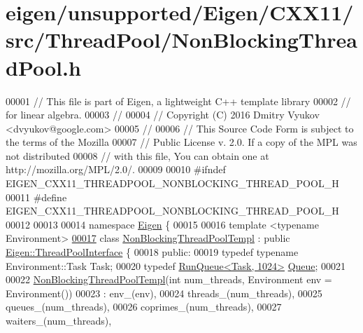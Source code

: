 \hypertarget{eigen_2unsupported_2_eigen_2_c_x_x11_2src_2_thread_pool_2_non_blocking_thread_pool_8h_source}{}\section{eigen/unsupported/\+Eigen/\+C\+X\+X11/src/\+Thread\+Pool/\+Non\+Blocking\+Thread\+Pool.h}
\label{eigen_2unsupported_2_eigen_2_c_x_x11_2src_2_thread_pool_2_non_blocking_thread_pool_8h_source}

\begin{DoxyCode}
00001 \textcolor{comment}{// This file is part of Eigen, a lightweight C++ template library}
00002 \textcolor{comment}{// for linear algebra.}
00003 \textcolor{comment}{//}
00004 \textcolor{comment}{// Copyright (C) 2016 Dmitry Vyukov <dvyukov@google.com>}
00005 \textcolor{comment}{//}
00006 \textcolor{comment}{// This Source Code Form is subject to the terms of the Mozilla}
00007 \textcolor{comment}{// Public License v. 2.0. If a copy of the MPL was not distributed}
00008 \textcolor{comment}{// with this file, You can obtain one at http://mozilla.org/MPL/2.0/.}
00009 
00010 \textcolor{preprocessor}{#ifndef EIGEN\_CXX11\_THREADPOOL\_NONBLOCKING\_THREAD\_POOL\_H}
00011 \textcolor{preprocessor}{#define EIGEN\_CXX11\_THREADPOOL\_NONBLOCKING\_THREAD\_POOL\_H}
00012 
00013 
00014 \textcolor{keyword}{namespace }\hyperlink{namespace_eigen}{Eigen} \{
00015 
00016 \textcolor{keyword}{template} <\textcolor{keyword}{typename} Environment>
\hyperlink{class_eigen_1_1_non_blocking_thread_pool_templ}{00017} \textcolor{keyword}{class }\hyperlink{class_eigen_1_1_non_blocking_thread_pool_templ}{NonBlockingThreadPoolTempl} : \textcolor{keyword}{public} 
      \hyperlink{class_eigen_1_1_thread_pool_interface}{Eigen::ThreadPoolInterface} \{
00018  \textcolor{keyword}{public}:
00019   \textcolor{keyword}{typedef} \textcolor{keyword}{typename} Environment::Task Task;
00020   \textcolor{keyword}{typedef} \hyperlink{class_eigen_1_1_run_queue}{RunQueue<Task, 1024>} \hyperlink{class_eigen_1_1_run_queue}{Queue};
00021 
00022   \hyperlink{class_eigen_1_1_non_blocking_thread_pool_templ}{NonBlockingThreadPoolTempl}(\textcolor{keywordtype}{int} num\_threads, Environment env = Environment())
00023       : env\_(env),
00024         threads\_(num\_threads),
00025         queues\_(num\_threads),
00026         coprimes\_(num\_threads),
00027         waiters\_(num\_threads),

\end{DoxyCode}
